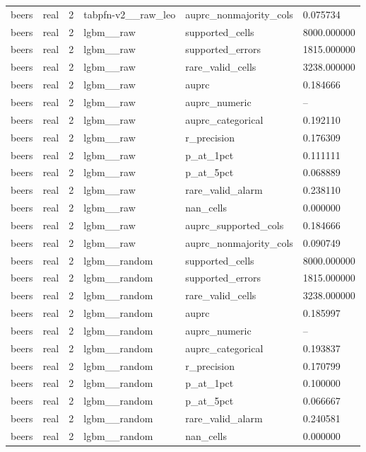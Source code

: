 \begin{tabular}{llllll}
beers & real & 2 & tabpfn-v2\_\_raw\_leo & auprc\_nonmajority\_cols & 0.075734 \\
beers & real & 2 & lgbm\_\_raw & supported\_cells & 8000.000000 \\
beers & real & 2 & lgbm\_\_raw & supported\_errors & 1815.000000 \\
beers & real & 2 & lgbm\_\_raw & rare\_valid\_cells & 3238.000000 \\
beers & real & 2 & lgbm\_\_raw & auprc & 0.184666 \\
beers & real & 2 & lgbm\_\_raw & auprc\_numeric & -- \\
beers & real & 2 & lgbm\_\_raw & auprc\_categorical & 0.192110 \\
beers & real & 2 & lgbm\_\_raw & r\_precision & 0.176309 \\
beers & real & 2 & lgbm\_\_raw & p\_at\_1pct & 0.111111 \\
beers & real & 2 & lgbm\_\_raw & p\_at\_5pct & 0.068889 \\
beers & real & 2 & lgbm\_\_raw & rare\_valid\_alarm & 0.238110 \\
beers & real & 2 & lgbm\_\_raw & nan\_cells & 0.000000 \\
beers & real & 2 & lgbm\_\_raw & auprc\_supported\_cols & 0.184666 \\
beers & real & 2 & lgbm\_\_raw & auprc\_nonmajority\_cols & 0.090749 \\
beers & real & 2 & lgbm\_\_random & supported\_cells & 8000.000000 \\
beers & real & 2 & lgbm\_\_random & supported\_errors & 1815.000000 \\
beers & real & 2 & lgbm\_\_random & rare\_valid\_cells & 3238.000000 \\
beers & real & 2 & lgbm\_\_random & auprc & 0.185997 \\
beers & real & 2 & lgbm\_\_random & auprc\_numeric & -- \\
beers & real & 2 & lgbm\_\_random & auprc\_categorical & 0.193837 \\
beers & real & 2 & lgbm\_\_random & r\_precision & 0.170799 \\
beers & real & 2 & lgbm\_\_random & p\_at\_1pct & 0.100000 \\
beers & real & 2 & lgbm\_\_random & p\_at\_5pct & 0.066667 \\
beers & real & 2 & lgbm\_\_random & rare\_valid\_alarm & 0.240581 \\
beers & real & 2 & lgbm\_\_random & nan\_cells & 0.000000 \\

\end{tabular}

